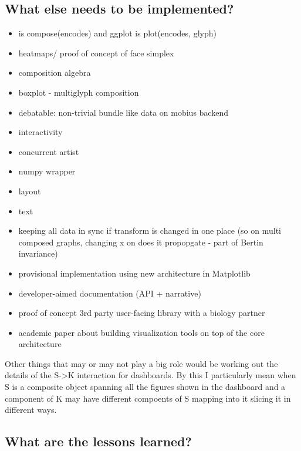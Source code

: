 \documentclass[../main.tex]{subfiles}
\begin{document}
\subsection{What else needs to be implemented?}
\begin{itemize}
    \item is compose(encodes) and ggplot is plot(encodes, glyph)
    \item heatmaps/ proof of concept of face simplex
    \item composition algebra
    \item boxplot - multiglyph composition
    \item debatable: non-trivial bundle like data on mobius backend
    \item interactivity 
    \item concurrent artist
    \item numpy wrapper
    \item layout
    \item text
    \item keeping all data in sync if transform is changed in one place (so on multi composed graphs, changing x on does it propopgate - part of Bertin invariance)
\end{itemize}
\begin{itemize}
    \item provisional implementation using new architecture in Matplotlib
    \item developer-aimed documentation (API + narrative)
    \item proof of concept 3rd party user-facing library with a biology partner
    \item academic paper about building visualization tools on top of the core architecture
\end{itemize}

Other things that may or may not play a big role would be working out the details of the S->K interaction for dashboards. By this I particularly mean when S is a composite object spanning all the figures shown in the dashboard and a component of K may have different compoents of S mapping into it slicing it in different ways.
\subsection{What are the lessons learned?}
\end{document}
